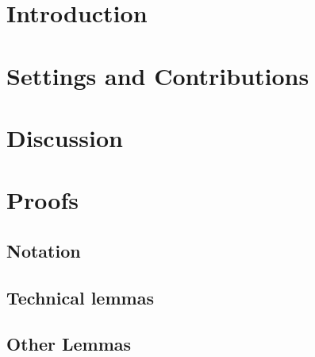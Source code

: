 




\maketitle

\begin{abstract}

\end{abstract}

\section{Introduction}



\section{Settings and Contributions} 



\section{Discussion}





\tableofcontents
\newpage

\section{Proofs} \label{sec:proofs}

\subsection{Notation}


\subsection{Technical lemmas}


\subsection{Other Lemmas}


